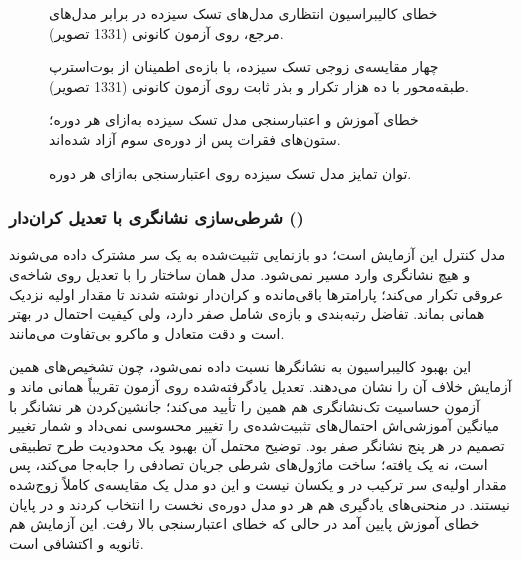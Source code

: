 \begin{figure}[htbp]
  \centering
  \caption{خطای کالیبراسیون انتظاری مدل‌های تسک سیزده در برابر مدل‌های مرجع، روی آزمون کانونی (1331 تصویر).}
  \label{fig:U16}
\end{figure}

\begin{figure}[htbp]
  \centering
  \caption{چهار مقایسه‌ی زوجی تسک سیزده، با بازه‌ی اطمینان از بوت‌استرپ طبقه‌محور با ده هزار تکرار و بذر ثابت روی آزمون کانونی (1331 تصویر).}
  \label{fig:U17}
\end{figure}

\begin{figure}[htbp]
  \centering
  \caption{خطای آموزش و اعتبارسنجی مدل تسک سیزده به‌ازای هر دوره؛ ستون‌های فقرات پس از دوره‌ی سوم آزاد شده‌اند.}
  \label{fig:U18}
\end{figure}

\begin{figure}[htbp]
  \centering
  \caption{توان تمایز مدل تسک سیزده روی اعتبارسنجی به‌ازای هر دوره.}
  
\end{figure}


\subsubsection{شرطی‌سازی نشانگری با تعدیل کران‌دار ()}

مدل  کنترل این آزمایش است؛ دو بازنمایی تثبیت‌شده به یک سر مشترک داده می‌شوند و هیچ نشانگری وارد مسیر نمی‌شود. مدل  همان ساختار را با تعدیل  روی شاخه‌ی عروقی تکرار می‌کند؛ پارامترها باقی‌مانده و کران‌دار نوشته شدند تا مقدار اولیه نزدیک همانی بماند. تفاضل رتبه‌بندی  و  بازه‌ی شامل صفر دارد، ولی کیفیت احتمال در  بهتر است و دقت متعادل و  ماکرو بی‌تفاوت می‌مانند.

این بهبود کالیبراسیون به نشانگرها نسبت داده نمی‌شود، چون تشخیص‌های همین آزمایش خلاف آن را نشان می‌دهند. تعدیل یادگرفته‌شده روی آزمون تقریباً همانی ماند و آزمون حساسیت تک‌نشانگری هم همین را تأیید می‌کند؛ جانشین‌کردن هر نشانگر با میانگین آموزشی‌اش احتمال‌های تثبیت‌شده‌ی  را تغییر محسوسی نمی‌داد و شمار تغییر تصمیم در هر پنج نشانگر صفر بود. توضیح محتمل آن بهبود یک محدودیت طرح تطبیقی است، نه یک یافته؛ ساخت ماژول‌های شرطی جریان تصادفی را جابه‌جا می‌کند، پس مقدار اولیه‌ی سر ترکیب در  و  یکسان نیست و این دو مدل یک مقایسه‌ی کاملاً زوج‌شده نیستند. در منحنی‌های یادگیری هم هر دو مدل دوره‌ی نخست را انتخاب کردند و در پایان خطای آموزش پایین آمد در حالی که خطای اعتبارسنجی بالا رفت. این آزمایش هم ثانویه و اکتشافی است.



